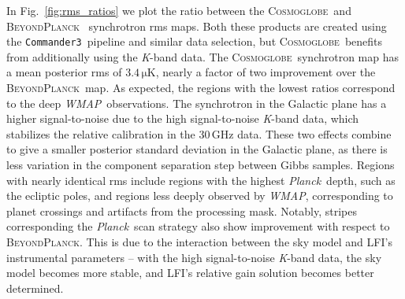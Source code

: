 \documentclass[twocolumn]{../../common/aa}
\def\WMAP{\emph{WMAP}}
\def\Planck{\emph{Planck}}
\def\commanderthree{\texttt{Commander3}}
\newcommand{\bp}{\textsc{BeyondPlanck}}
\newcommand{\cosmoglobe}{\textsc{Cosmoglobe}}
\newcommand{\K}[0]{\textit K}
\begin{document}
In Fig.~\ref{fig:rms_ratios} we plot the ratio between the \cosmoglobe\ and \bp\ \citep{bp01} synchrotron rms maps. Both these products are created using the \commanderthree\ pipeline and similar data selection, but \cosmoglobe\ benefits from additionally using the \K-band data. The \cosmoglobe\ synchrotron map has a mean posterior rms of $3.4\,\mathrm{\mu K}$, nearly a factor of two improvement over the \bp\ map.
As expected, the regions with the lowest ratios correspond to the deep \WMAP\ observations. The synchrotron in the Galactic plane has a higher signal-to-noise due to the high signal-to-noise \K-band data, which stabilizes the relative calibration in the 30\,GHz data. 
These two effects combine to give a smaller posterior standard deviation in the Galactic plane, as there is less variation in the component separation step between Gibbs samples.
Regions with nearly identical rms include regions with the highest \Planck\ depth, such as the ecliptic poles, and regions less deeply observed by \WMAP, corresponding to planet crossings and artifacts from the processing mask. Notably, stripes corresponding the \Planck\ scan strategy also show improvement with respect to \bp. This is due to the interaction between the sky model and LFI's instrumental parameters -- with the high signal-to-noise \K-band data, the sky model becomes more stable, and LFI's relative gain solution becomes better determined.
\end{document}

